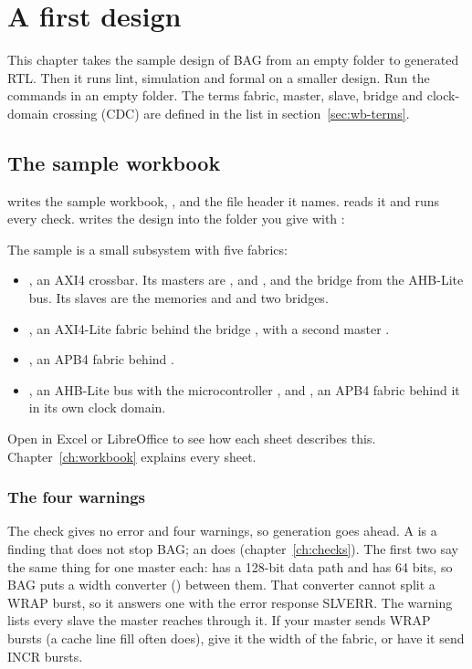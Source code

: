 \chapter{A first design}
\label{ch:first}

This chapter takes the sample design of BAG from an empty folder to generated RTL. Then
it runs lint, simulation and formal on a smaller design. Run the commands in an empty
folder. The terms fabric, master, slave, bridge and clock-domain crossing (CDC) are
defined in the list in section~\ref{sec:wb-terms}.

\section{The sample workbook}

 writes the sample workbook, , and the file
header it names.  reads it and runs every check. 
writes the design into the folder you give with :



The sample is a small subsystem with five fabrics:

\begin{itemize}
\item {}, an AXI4 crossbar. Its masters are ,  and
  , and the bridge  from the AHB-Lite bus. Its slaves are
  the memories  and  and two bridges.
\item {}, an AXI4-Lite fabric behind the bridge , with a
  second master .
\item {}, an APB4 fabric behind .
\item {}, an AHB-Lite bus with the microcontroller , and
  , an APB4 fabric behind it in its own clock domain.
\end{itemize}

Open  in Excel or LibreOffice to see how each sheet describes this.
Chapter~\ref{ch:workbook} explains every sheet.

\subsection{The four warnings}

The check gives no error and four warnings, so generation goes ahead. A
 is a finding that does not stop BAG; an  does
(chapter~\ref{ch:checks}). The first two say the same thing for one master each:
 has a 128-bit data path and  has 64 bits, so BAG puts a
width converter () between them. That converter cannot split a
WRAP burst, so it answers one with the error response SLVERR. The warning lists every
slave the master reaches through it. If your master sends WRAP bursts (a cache line
fill often does), give it the width of the fabric, or have it send INCR bursts.

